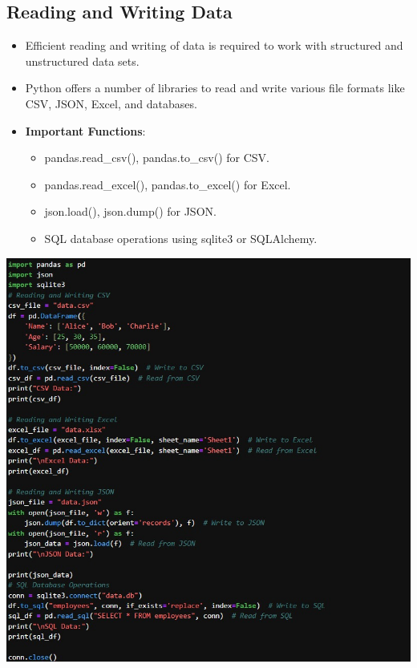 \documentclass{article}
\begin{document}
\subsection {Reading and Writing Data}
\begin{itemize}
    \item Efficient reading and writing of data is required to work with structured and unstructured data sets.
    \item Python offers a number of libraries to read and write various file formats like CSV, JSON, Excel, and databases.
    \item \textbf{Important Functions}:
    \begin{itemize}
    \item pandas.read\_csv(), pandas.to\_csv() for CSV.
    \item pandas.read\_excel(), pandas.to\_excel() for Excel.
    \item json.load(), json.dump() for JSON.
    \item SQL database operations using sqlite3 or SQLAlchemy.
    \end{itemize}
    
\end{itemize}

\includegraphics[width=14cm,height=16
cm]{Reading&Writing.jpeg}
\end{document}

